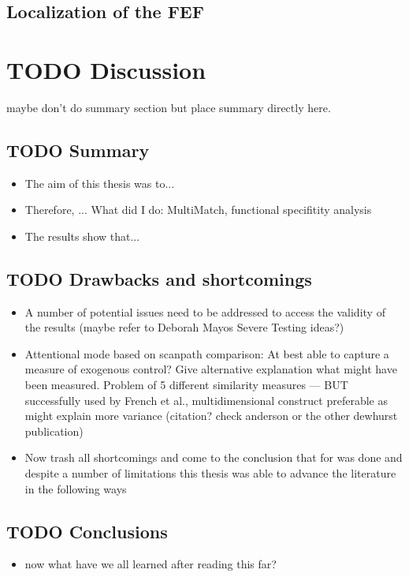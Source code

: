\documentclass[a4paper, 12pt]{scrreprt}
\begin{document}
\section{Localization of the FEF}\label{results_FEF}

\chapter{TODO Discussion}\label{discussion}
maybe don't do summary section but place summary directly here.
\section{TODO Summary}
\begin{itemize}
	\item The aim of this thesis was to...
	\item Therefore, ... What did I do: MultiMatch, functional specifitity analysis
	\item The results show that...
\end{itemize}
\section{TODO Drawbacks and shortcomings}
\begin{itemize}
	\item A number of potential issues need to be addressed to access the validity of the results (maybe refer to Deborah Mayos Severe Testing ideas?)
	\item Attentional mode based on scanpath comparison: At best able to capture a measure of exogenous control? Give alternative explanation what might have been measured. Problem of 5 different similarity measures --- BUT successfully used by French et al., multidimensional construct preferable as might explain more variance (citation? check anderson or the other dewhurst publication) 
	\item Now trash all shortcomings and come to the conclusion that for was done and despite a number of limitations this thesis was able to advance the literature in the following ways
\end{itemize}
\section{TODO Conclusions}
\begin{itemize}
	\item now what have we all learned after reading this far?
\end{itemize}
\end{document}
